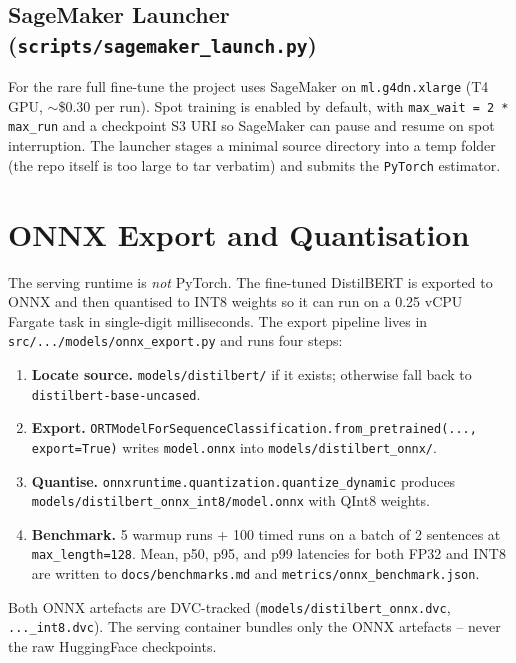 \documentclass[11pt,a4paper]{article}
\begin{document}
\subsection{SageMaker Launcher (\texttt{scripts/sagemaker\_launch.py})}

For the rare full fine-tune the project uses SageMaker on \texttt{ml.g4dn.xlarge}
(T4 GPU, $\sim$\$0.30 per run). Spot training is enabled by default, with
\texttt{max\_wait = 2 * max\_run} and a checkpoint S3 URI so SageMaker can pause
and resume on spot interruption. The launcher stages a minimal source directory into
a temp folder (the repo itself is too large to tar verbatim) and submits the
\texttt{PyTorch} estimator.

\section{ONNX Export and Quantisation}

The serving runtime is \emph{not} PyTorch. The fine-tuned DistilBERT is exported to
ONNX and then quantised to INT8 weights so it can run on a 0.25 vCPU Fargate task
in single-digit milliseconds. The export pipeline lives in
\texttt{src/.../models/onnx\_export.py} and runs four steps:

\begin{enumerate}[leftmargin=*]
\item \textbf{Locate source.} \texttt{models/distilbert/} if it exists; otherwise
      fall back to \texttt{distilbert-base-uncased}.
\item \textbf{Export.} \texttt{ORTModelForSequenceClassification.from\_pretrained(...,
      export=True)} writes \texttt{model.onnx} into
      \texttt{models/distilbert\_onnx/}.
\item \textbf{Quantise.} \texttt{onnxruntime.quantization.quantize\_dynamic} produces
      \texttt{models/distilbert\_onnx\_int8/model.onnx} with QInt8 weights.
\item \textbf{Benchmark.} 5 warmup runs + 100 timed runs on a batch of 2 sentences at
      \texttt{max\_length=128}. Mean, p50, p95, and p99 latencies for both FP32 and
      INT8 are written to \texttt{docs/benchmarks.md} and
      \texttt{metrics/onnx\_benchmark.json}.
\end{enumerate}

Both ONNX artefacts are DVC-tracked
(\texttt{models/distilbert\_onnx.dvc}, \texttt{...\_int8.dvc}). The serving container
bundles only the ONNX artefacts -- never the raw HuggingFace checkpoints.
\end{document}
